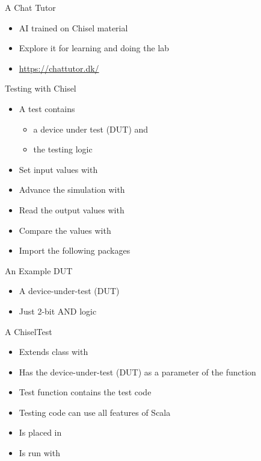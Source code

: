 \begin{frame}[fragile]{A Chat Tutor}
\begin{itemize}
\item AI trained on Chisel material
\item Explore it for learning and doing the lab
\item \url{https://chattutor.dk/}
\end{itemize}
\end{frame}


\begin{frame}[fragile]{Testing with Chisel}
\begin{itemize}
\item A test contains
\begin{itemize}
\item a device under test (DUT) and
\item the testing logic
\end{itemize}
\item Set input values with 
\item Advance the simulation with 
\item Read the output values with 
\item Compare the values with 
\item Import the following packages
\end{itemize}
\end{frame}

\begin{frame}[fragile]{An Example DUT}
\begin{itemize}
\item A device-under-test (DUT)
\item Just 2-bit AND logic
\end{itemize}
\end{frame}

\begin{frame}[fragile]{A ChiselTest}
\begin{itemize}
\item Extends class  with 
\item Has the device-under-test (DUT) as a parameter of the  function
\item Test function contains the test code
\item Testing code can use all features of Scala
\item Is placed in 
\item Is run with 
\end{itemize}
\end{frame}


